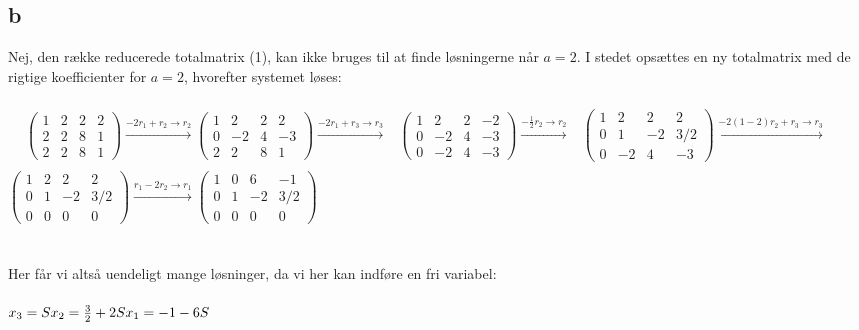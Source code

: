 \documentclass{article}
\begin{document}
\subsection*{b}
Nej, den række reducerede totalmatrix (1), kan ikke bruges til at finde løsningerne når $a=2$. I stedet opsættes en ny totalmatrix med de rigtige koefficienter for $a=2$, hvorefter systemet løses:
\\
\\
$\begin{aligned} & \left(\begin{array}{ccc|c}1 & 2 & 2 & 2 \\ 2 & 2 & 8 & 1 \\ 2 & 2 & 8 & 1\end{array}\right) \stackrel{-2 r_1+r_2 \rightarrow r_2}{\longrightarrow}\left(\begin{array}{ccc|c}1 & 2 & 2 & 2 \\ 0 & -2 & 4 & -3 \\ 2 & 2 & 8 & 1\end{array}\right) \stackrel{-2 r_1+r_3 \rightarrow r_3}{\longrightarrow} & \left(\begin{array}{ccc|c}1 & 2 & 2 & -2 \\ 0 & -2 & 4 & -3 \\ 0 & -2 & 4 & -3\end{array}\right) \stackrel{-\frac{1}{2} r_2 \rightarrow r_2}{\longrightarrow}
& \left(\begin{array}{ccc|c}1 & 2 & 2 & 2 \\ 0 & 1 & -2 & 3 / 2 \\ 0 & -2 & 4 & -3\end{array}\right)  \stackrel{-2(1-2) r_2+r_3 \rightarrow r_3}{\longrightarrow} \\ & \end{aligned}$
$\left(\begin{array}{ccc|c}1 & 2 & 2 & 2 \\ 0 & 1 & -2 & 3 / 2 \\ 0 & 0 & 0 & 0\end{array}\right) \stackrel{r_1-2 r_2 \rightarrow r_1}{\longrightarrow}\left(\begin{array}{ccc|c}1 & 0 & 6 & -1 \\ 0 & 1 & -2 & 3 / 2 \\ 0 & 0 & 0 & 0\end{array}\right)$
\\
\\
\\
Her får vi altså uendeligt mange løsninger, da vi her kan indføre en fri variabel:
\\
\\
$x_3= S \\ x_2=\frac{3}{2}+2S \\ x_1 = -1-6S$
\\
\\
\\
\\
\\
\\
\\
\end{document}
